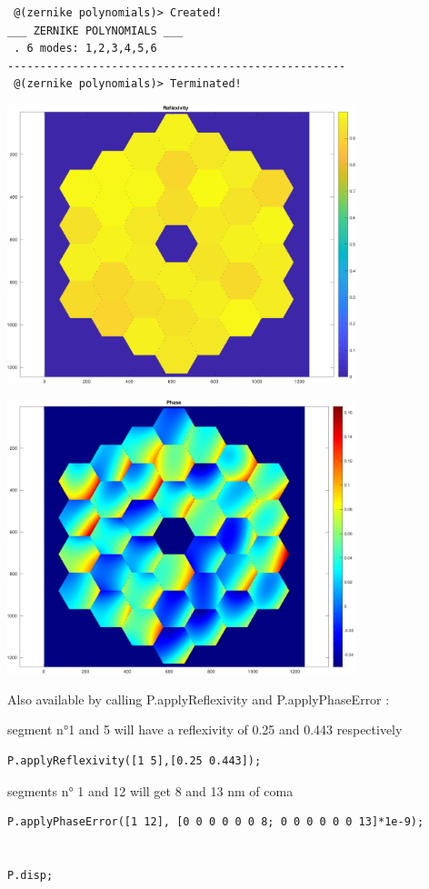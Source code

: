 \documentclass[12pt]{article}
\begin{document}
        \color{lightgray} \begin{verbatim} @(zernike polynomials)> Created!
___ ZERNIKE POLYNOMIALS ___
 . 6 modes: 1,2,3,4,5,6
----------------------------------------------------
 @(zernike polynomials)> Terminated!
\end{verbatim} \color{black}
    
\includegraphics [width=4in]{docuPupilClass_07.pdf}

\includegraphics [width=4in]{docuPupilClass_08.pdf}
\begin{par}
Also available by calling P.applyReflexivity and P.applyPhaseError :
\end{par} \vspace{1em}
\begin{par}
segment n°1 and 5 will have a reflexivity of 0.25 and 0.443 respectively
\end{par} \vspace{1em}
\begin{verbatim}
P.applyReflexivity([1 5],[0.25 0.443]);
\end{verbatim}
\begin{par}
segments n° 1 and 12 will get 8 and 13 nm of coma
\end{par} \vspace{1em}
\begin{verbatim}
P.applyPhaseError([1 12], [0 0 0 0 0 0 8; 0 0 0 0 0 0 13]*1e-9);


P.disp;
\end{verbatim}
\end{document}
